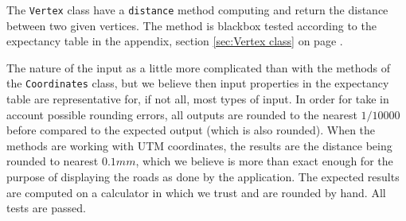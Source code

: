 The \texttt{Vertex} class have a \texttt{distance} method computing and return the distance between two given vertices. The method is blackbox tested according to the expectancy table in the appendix, section \ref{sec:Vertex class} on page \pageref{sec:Vertex class}.

The nature of the input as a little more complicated than with the methods of the \texttt{Coordinates} class, but we believe then input properties in the expectancy table are representative for, if not all, most types of input. In order for take in account possible rounding errors, all outputs are rounded to the nearest $1/10000$ before compared to the expected output (which is also rounded). When the methods are working with UTM coordinates, the results are the distance being rounded to nearest $0.1 mm$, which we believe is more than exact enough for the purpose of displaying the roads as done by the application. The expected results are computed on a calculator in which we trust and are rounded by hand. All tests are passed.

